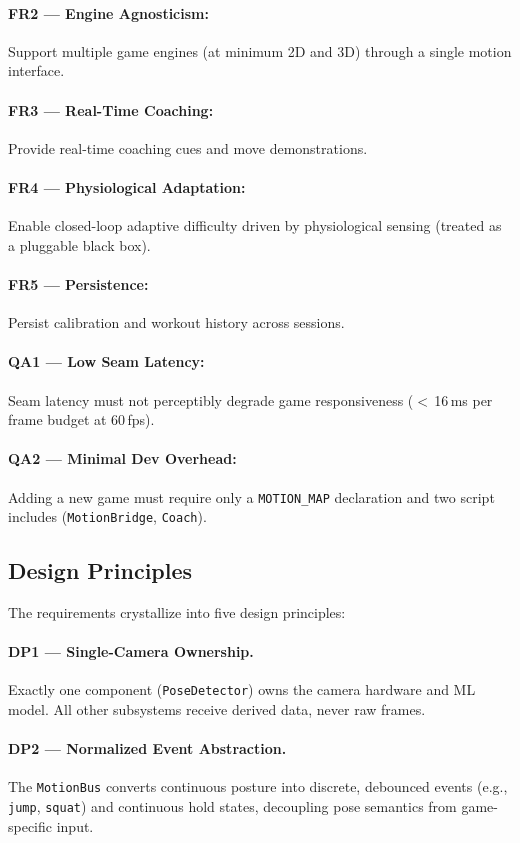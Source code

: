 \documentclass[runningheads]{llncs}
\newcommand{\motionbus}{\texttt{MotionBus}}
\newcommand{\motionbridge}{\texttt{MotionBridge}}
\newcommand{\motionmap}{\texttt{MOTION\_MAP}}
\begin{document}
\paragraph{FR2 --- Engine Agnosticism:} Support multiple game engines (at minimum 2D and 3D) through a single motion interface.
\paragraph{FR3 --- Real-Time Coaching:} Provide real-time coaching cues and move demonstrations.
\paragraph{FR4 --- Physiological Adaptation:} Enable closed-loop adaptive difficulty driven by physiological sensing (treated as a pluggable black box).
\paragraph{FR5 --- Persistence:} Persist calibration and workout history across sessions.
\paragraph{QA1 --- Low Seam Latency:} Seam latency must not perceptibly degrade game responsiveness ($<$\,16\,ms per frame budget at 60\,fps).
\paragraph{QA2 --- Minimal Dev Overhead:} Adding a new game must require only a \motionmap{} declaration and two script includes (\motionbridge{}, \texttt{Coach}).

\subsection{Design Principles}

The requirements crystallize into five design principles:

\paragraph{DP1 --- Single-Camera Ownership.} Exactly one component
(\texttt{PoseDetector}) owns the camera hardware and ML model.
All other subsystems receive derived data, never raw frames.
\paragraph{DP2 --- Normalized Event Abstraction.} The \motionbus{} converts
continuous posture into discrete, debounced events (e.g., \texttt{jump},
\texttt{squat}) and continuous hold states, decoupling pose semantics
from game-specific input.
\end{document}
